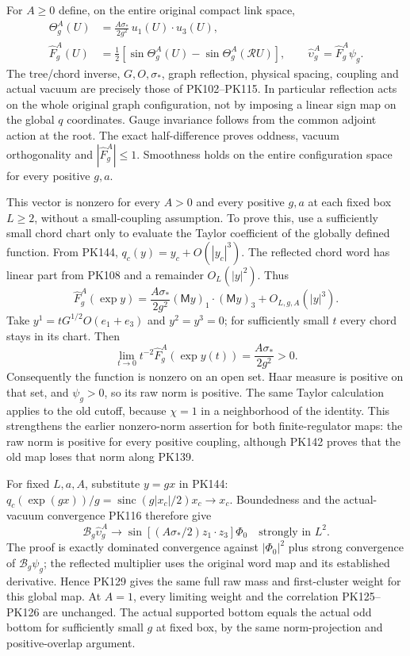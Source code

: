 \documentclass[11pt]{article}
\begin{document}
For \(A\ge0\) define, on the entire original compact link space,
\[
 \begin{split}
 \Theta_g^A(U)&=\frac{A\sigma_*}{2g^2}\,
                            u_1(U)\cdot u_3(U),\\
 \widehat F_g^A(U)&=\frac12\left[
             \sin\Theta_g^A(U)-\sin\Theta_g^A(\mathcal RU)\right],
 \qquad
 \widehat\upsilon_g^A=\widehat F_g^A\psi_g .
 \end{split}\tag{PK145}
\]
The tree/chord inverse, \(G,O,\sigma_*\), graph reflection, physical
spacing, coupling and actual vacuum are precisely those of PK102–PK115.
In particular reflection acts on the whole original graph configuration,
not by imposing a linear sign map on the global \(q\) coordinates.
Gauge invariance follows from the common adjoint action at the root.
The exact half-difference proves oddness, vacuum orthogonality and
\(|\widehat F_g^A|\le1\). Smoothness holds on the entire configuration
space for every positive \(g,a\).

This vector is nonzero for every \(A>0\) and every positive \(g,a\)
at each fixed box \(L\ge2\), without a small-coupling assumption.
To prove this, use a sufficiently small chord chart only to evaluate
the Taylor coefficient of the globally defined function. From PK144,
\(q_c(y)=y_c+O(|y_c|^3)\).
The reflected chord word has linear part from PK108 and a remainder
\(O_L(|y|^2)\). Thus
\[
 \widehat F_g^A(\exp y)
 =\frac{A\sigma_*}{2g^2}
       (\mathsf M y)_1\cdot(\mathsf M y)_3+O_{L,g,A}(|y|^3).
 \tag{PK146}
\]
Take \(y^1=tG^{1/2}O(e_1+e_3)\) and \(y^2=y^3=0\);
for sufficiently small \(t\) every chord stays in its chart. Then
\[
 \lim_{t\to0}t^{-2}\widehat F_g^A(\exp y(t))
                         =\frac{A\sigma_*}{2g^2}>0 .
 \tag{PK147}
\]
Consequently the function is nonzero on an open set. Haar measure
is positive on that set, and \(\psi_g>0\), so its raw norm is positive.
The same Taylor calculation applies to the old cutoff, because
\(\chi=1\) in a neighborhood of the identity. This strengthens the
earlier nonzero-norm assertion for both finite-regulator maps: the
raw norm is positive for every positive coupling, although PK142
proves that the old map loses that norm along PK139.

For fixed \(L,a,A\), substitute \(y=gx\) in PK144:
\(q_c(\exp(gx))/g=\operatorname{sinc}(g|x_c|/2)x_c\to x_c\).
Boundedness and the actual-vacuum convergence PK116 therefore give
\[
 \mathcal B_g\widehat\upsilon_g^A
   \longrightarrow
       \sin[(A\sigma_*/2)z_1\cdot z_3]\Phi_0
       \quad\text{strongly in }L^2.
 \tag{PK148}
\]
The proof is exactly dominated convergence against \(|\Phi_0|^2\)
plus strong convergence of \(\mathcal B_g\psi_g\); the reflected
multiplier uses the original word map and its established derivative.
Hence PK129 gives the same full raw mass and first-cluster weight
for this global map. At \(A=1\), every limiting weight and the
correlation PK125–PK126 are unchanged. The actual supported bottom
equals the actual odd bottom for sufficiently small \(g\) at fixed box,
by the same norm-projection and positive-overlap argument.
\end{document}
